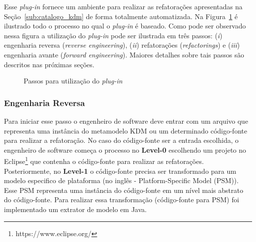Esse \textit{plug-in} fornece um ambiente para realizar as refatorações apresentadas na Seção~\ref{sub:catalogo_kdm} de forma totalmente automatizada. Na Figura~\ref{fig:ferramenta} é ilustrado todo o processo no qual o \textit{plug-in} é baseado. Como pode ser observado nessa figura a utilização do \textit{plug-in} pode ser ilustrada em três passos: (\textit{i}) engenharia reversa (\textit{reverse engineering}), (\textit{ii}) refatorações (\textit{refactorings}) e (\textit{iii}) engenharia avante (\textit{forward engineering}). Maiores detalhes sobre tais passos são descritos nas próximas seções.

\begin{figure}[!h]
 \centering

\caption{Passos para utilização do \textit{plug-in}}
 \label{fig:ferramenta}
\end{figure}


 \subsubsection{Engenharia Reversa}

Para iniciar esse passo o engenheiro de software deve entrar com um arquivo que representa uma instância do metamodelo KDM ou um determinado código-fonte para realizar a refatoração. No caso do código-fonte ser a entrada escolhida, o engenheiro de software começa o processo no \textbf{Level-0} escolhendo um projeto no Eclipse\footnote{https://www.eclipse.org/} que contenha o código-fonte para realizar as refatorações. Posteriormente, no \textbf{Level-1} o código-fonte precisa ser transformado para um modelo especifico de plataforma (no inglês - Platform-Specific Model (PSM)). Esse PSM representa uma instância do código-fonte em um nível mais abstrato do código-fonte. Para realizar essa transformação (código-fonte para PSM) foi implementado um extrator de modelo em Java.

